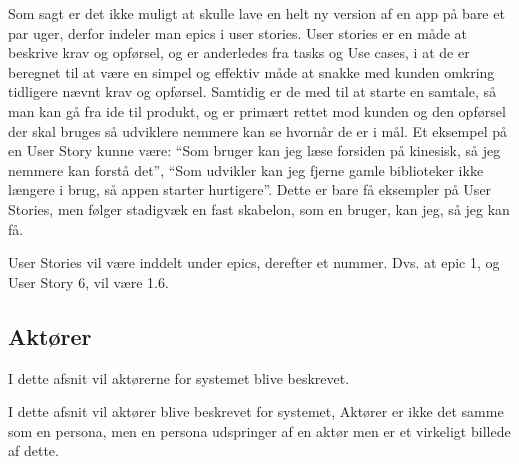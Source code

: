 Som sagt er det ikke muligt at skulle lave en helt ny version af en app på bare et par uger, derfor indeler man epics i user stories. User stories er en måde at beskrive krav og opførsel, og er anderledes fra tasks og Use cases, i at de er beregnet til at være en simpel og effektiv måde at snakke med kunden omkring tidligere nævnt krav og opførsel. Samtidig er de med til at starte en samtale, så man kan gå fra ide til produkt, og er primært rettet mod kunden og den opførsel der skal bruges så udviklere nemmere kan se hvornår de er i mål. Et eksempel på en User Story kunne være: ``Som bruger kan jeg læse forsiden på kinesisk, så jeg nemmere kan forstå det'', ``Som udvikler kan jeg fjerne gamle biblioteker ikke længere i brug, så appen starter hurtigere''. Dette er bare få eksempler på User Stories, men følger stadigvæk en fast skabelon, som en bruger, kan jeg, så jeg kan få.

User Stories vil være inddelt under epics, derefter et nummer. Dvs. at epic 1, og User Story 6, vil være 1.6.

\subsection{Aktører}

I dette afsnit vil aktørerne for systemet blive beskrevet.

I dette afsnit vil aktører blive beskrevet for systemet, Aktører er ikke det samme som en persona, men en persona udspringer af en aktør men er et virkeligt billede af dette.

